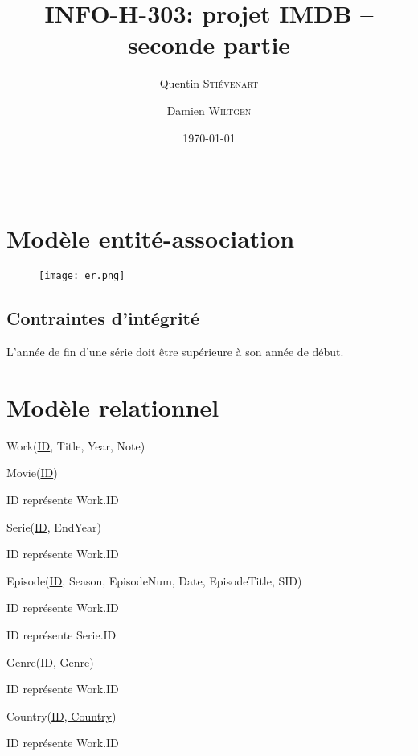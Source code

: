 \documentclass[a4paper,12pt]{article}
\title{INFO-H-303: projet IMDB -- seconde partie}
\author{Quentin \textsc{Stiévenart} \and Damien \textsc{Wiltgen}}
\date{\today}
\newcommand{\HRule}{\rule{\linewidth}{0.5mm}}
\begin{document}
\maketitle

\HRule

\section{Modèle entité-association}

\begin{figure}[ht!]
  \centering
  \centerline{\texttt{[image: er.png]}}
\end{figure}

\subsection{Contraintes d'intégrité}
\begin{list}{-}{}
  \item L'année de fin d'une série doit être supérieure à son année de début.
\end{list}
\section{Modèle relationnel}
Work(\underline{ID}, Title, Year, Note)

Movie(\underline{ID})
\begin{list}{-}{}
  \item ID représente Work.ID
\end{list}

Serie(\underline{ID}, EndYear)
\begin{list}{-}{}
  \item ID représente Work.ID
\end{list}

Episode(\underline{ID}, Season, EpisodeNum, Date, EpisodeTitle, SID)
\begin{list}{-}{}
  \item ID représente Work.ID
  \item ID représente Serie.ID
\end{list}

Genre(\underline{ID, Genre})
\begin{list}{-}{}
  \item ID représente Work.ID
\end{list}

Country(\underline{ID, Country})
\begin{list}{-}{}
  \item ID représente Work.ID
\end{list}
\end{document}
